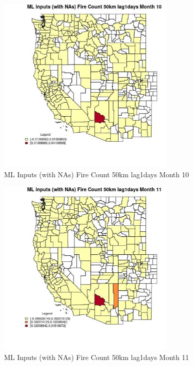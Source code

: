 \begin{figure} 
\centering  
\includegraphics[width=0.77\textwidth]{Code_Outputs/Report_ML_input_PM25_Step4_part_e_de_duplicated_aves_compiled_2019-05-20wNAs_CountyFire_Count_50km_lag1daysmedianMonth10.jpg} 
\caption{\label{fig:Report_ML_input_PM25_Step4_part_e_de_duplicated_aves_compiled_2019-05-20wNAsCountyFire_Count_50km_lag1daysmedianMonth10}ML Inputs (with NAs) Fire Count 50km lag1days Month 10} 
\end{figure} 
 

\clearpage 

\begin{figure} 
\centering  
\includegraphics[width=0.77\textwidth]{Code_Outputs/Report_ML_input_PM25_Step4_part_e_de_duplicated_aves_compiled_2019-05-20wNAs_CountyFire_Count_50km_lag1daysmedianMonth11.jpg} 
\caption{\label{fig:Report_ML_input_PM25_Step4_part_e_de_duplicated_aves_compiled_2019-05-20wNAsCountyFire_Count_50km_lag1daysmedianMonth11}ML Inputs (with NAs) Fire Count 50km lag1days Month 11} 
\end{figure} 
 

